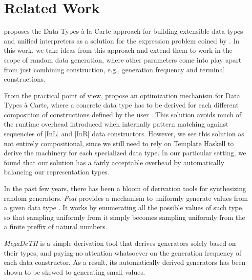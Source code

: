 \section{Related Work}
\label{sec:related}

\citeauthor{SwierstraDTC} \cite{SwierstraDTC} proposes the Data Types \`a la
Carte approach for building extensible data types and unified interpreters as a
solution for the expression problem coined by \citeauthor{wadler1998expression}
\cite{wadler1998expression}.
%
In this work, we take ideas from this approach and extend them to work in the
scope of random data generation, where other parameters come into play apart
from just combining construction, e.g., generation frequency and terminal
constructions.


From the practical point of view, \citeauthor{KiriyamaOptimizingDTC} propose an
optimization mechanism for Data Types \`a Carte, where a concrete data type has
to be derived for each different composition of constructions defined by the
user \cite{KiriyamaOptimizingDTC}.
%
This solution avoids much of the runtime overhead introduced when internally
pattern matching against sequencies of |InL| and |InR| data constructors.
%
However, we see this solution as not entirely compositional, since we still need
to rely on Template Haskell to derive the machinery for each specialized data
type.
%
In our particular setting, we found that our solution has a fairly acceptable
overhead by automatically balancing our representation types.


In the past few years, there has been a bloom of derivation tools for
synthesizing random generators.
%
\emph{Feat} provides a mechanism to uniformly generate values from a given data
type \cite{DuregardJW12}.
%
It works by enumerating all the possible values of such type, so that sampling
uniformly from it simply becomes sampling uniformly from the a finite preffix of
natural numbers.


\emph{MegaDeTH} is a simple derivation tool that derives generators solely based
on their types, and paying no attention whatsoever on the generation frequency
of each data constructor.
%
As a result, its automatically derived generators has been shown to be skewed to
generating small values\cite{DBLP:conf/haskell/MistaRH18}.


